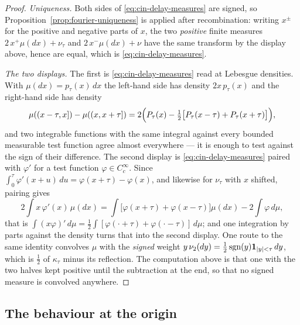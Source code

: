 \begin{proof}
\emph{Uniqueness.} Both sides of \ref{eq:cin-delay-measures} are signed, so
Proposition~\ref{prop:fourier-uniqueness} is applied after recombination: writing $x^{\pm}$
for the positive and negative parts of $x$, the two \emph{positive} finite measures
$2\,x^{+}\mu(dx) + \nu_\tau$ and $2\,x^{-}\mu(dx) + \nu$ have the same transform
by the display above, hence are equal, which is \ref{eq:cin-delay-measures}.

\emph{The two displays.} The first is \ref{eq:cin-delay-measures} read at Lebesgue densities.
With $\mu(dx) = p_\tau(x)\,dx$ the left-hand side has density $2x\,p_\tau(x)$ and the right-hand
side has density
\[
  \mu((x-\tau,x]) - \mu((x,x+\tau])
  = 2\Bigl(P_\tau(x) - \tfrac12\bigl[P_\tau(x-\tau) + P_\tau(x+\tau)\bigr]\Bigr),
\]
and two integrable functions with the same integral against every bounded measurable test
function agree almost everywhere --- it is enough to test against the sign of their difference.
The second display is \ref{eq:cin-delay-measures} paired with $\varphi'$ for a test function
$\varphi \in C_c^\infty$. Since $\int_0^\tau \varphi'(x+u)\,du = \varphi(x+\tau) - \varphi(x)$,
and likewise for $\nu_\tau$ with $x$ shifted, pairing gives
\[
  2\int x\,\varphi'(x)\,\mu(dx)
   = \int\bigl[\varphi(x+\tau) + \varphi(x-\tau)\bigr]\mu(dx) - 2\int \varphi\,d\mu ,
\]
that is $\int (x\varphi)'\,d\mu = \tfrac12\int[\varphi(\cdot+\tau) + \varphi(\cdot-\tau)]\,d\mu$;
and one integration by parts against the density turns that into the second display. One route
to the same identity convolves $\mu$ with the \emph{signed} weight
$y\,\nu_2(dy) = \tfrac12\operatorname{sgn}(y)\mathbf 1_{|y|<\tau}\,dy$, which is $\tfrac12$ of $\kappa_\tau$
minus its reflection. The computation above is that one with the two halves kept positive until
the subtraction at the end, so that no signed measure is convolved anywhere.
\end{proof}

\subsection{The behaviour at the origin}\label{sec:origin}

